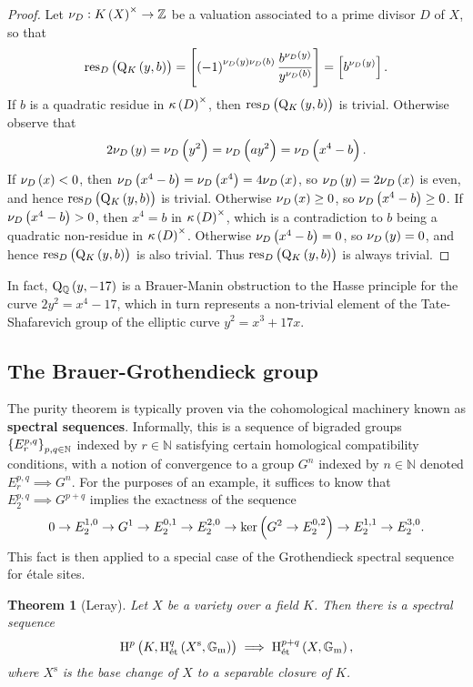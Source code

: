 \documentclass{article}
\newtheorem*{theorem}{Theorem}
\newcommand{\br}{\del}
\newcommand{\et}{\mathrm{\acute{e}t}}
\newcommand{\Gm}{\mathbb{G}_\mathrm{m}}
\renewcommand{\H}{\mathrm{H}}
\newcommand{\NN}{\mathbb{N}}
\newcommand{\Q}{\mathrm{Q}}
\newcommand{\QQ}{\mathbb{Q}}
\newcommand{\res}{\mathrm{res}}
\newcommand{\s}{\mathrm{s}}
\newcommand{\ZZ}{\mathbb{Z}}
\begin{document}
\begin{proof}
Let $ \nu_D : K\br{X}^\times \to \ZZ $ be a valuation associated to a prime divisor $ D $ of $ X $, so that
$$ \res_D\br{\Q_K\br{y, b}} = \sbr{\br{-1}^{\nu_D\br{y}\nu_D\br{b}}\dfrac{b^{\nu_D\br{y}}}{y^{\nu_D\br{b}}}} = \sbr{b^{\nu_D\br{y}}}. $$
If $ b $ is a quadratic residue in $ \kappa\br{D}^\times $, then $ \res_D\br{\Q_K\br{y, b}} $ is trivial. Otherwise observe that
$$ 2\nu_D\br{y} = \nu_D\br{y^2} = \nu_D\br{ay^2} = \nu_D\br{x^4 - b}. $$
If $ \nu_D\br{x} < 0 $, then $ \nu_D\br{x^4 - b} = \nu_D\br{x^4} = 4\nu_D\br{x} $, so $ \nu_D\br{y} = 2\nu_D\br{x} $ is even, and hence $ \res_D\br{\Q_K\br{y, b}} $ is trivial. Otherwise $ \nu_D\br{x} \ge 0 $, so $ \nu_D\br{x^4 - b} \ge 0 $. If $ \nu_D\br{x^4 - b} > 0 $, then $ x^4 = b $ in $ \kappa\br{D}^\times $, which is a contradiction to $ b $ being a quadratic non-residue in $ \kappa\br{D}^\times $. Otherwise $ \nu_D\br{x^4 - b} = 0 $, so $ \nu_D\br{y} = 0 $, and hence $ \res_D\br{\Q_K\br{y, b}} $ is also trivial. Thus $ \res_D\br{\Q_K\br{y, b}} $ is always trivial.
\end{proof}

In fact, $ \Q_\QQ\br{y, -17} $ is a Brauer-Manin obstruction to the Hasse principle for the curve $ 2y^2 = x^4 - 17 $, which in turn represents a non-trivial element of the Tate-Shafarevich group of the elliptic curve $ y^2 = x^3 + 17x $.

\pagebreak

\subsection{The Brauer-Grothendieck group}

The purity theorem is typically proven via the cohomological machinery known as \textbf{spectral sequences}. Informally, this is a sequence of bigraded groups $ \cbr{E_r^{p, q}}_{p, q \in \NN} $ indexed by $ r \in \NN $ satisfying certain homological compatibility conditions, with a notion of convergence to a group $ G^n $ indexed by $ n \in \NN $ denoted $ E_r^{p, q} \implies G^n $. For the purposes of an example, it suffices to know that $ E_2^{p, q} \implies G^{p + q} $ implies the exactness of the sequence
$$ 0 \to E_2^{1, 0} \to G^1 \to E_2^{0, 1} \to E_2^{2, 0} \to \ker\br{G^2 \to E_2^{0, 2}} \to E_2^{1, 1} \to E_2^{3, 0}. $$
This fact is then applied to a special case of the Grothendieck spectral sequence for \'etale sites.

\begin{theorem}[Leray]
Let $ X $ be a variety over a field $ K $. Then there is a spectral sequence
$$ \H^p\br{K, \H_\et^q\br{X^\s, \Gm}} \implies \H_\et^{p + q}\br{X, \Gm}, $$
where $ X^\s $ is the base change of $ X $ to a separable closure of $ K $.
\end{theorem}
\end{document}
